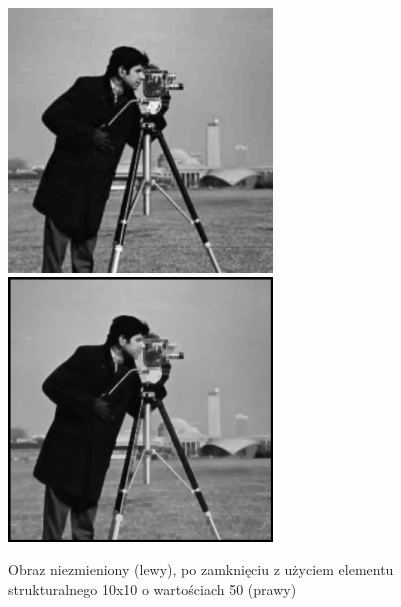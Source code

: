 \documentclass[a4paper,12pt]{book}
\begin{document}
\begin{figure}[H]
	\caption{Obraz niezmieniony (lewy), po zamknięciu z użyciem elementu strukturalnego 10x10 o wartościach 50 (prawy)}
	\includegraphics[width=7cm, height=7cm]{man-unmodified.jpg}
	\includegraphics[width=7cm, height=7cm]{morph-gray-closing-strel10x10-50.png}
\end{figure}
\end{document}
